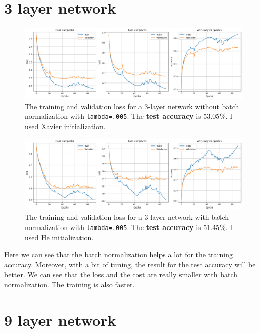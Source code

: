 \documentclass{article}
\begin{document}
\section*{3 layer network}

\begin{figure}[H]
    \centering
    \includegraphics[width=\linewidth]{Result_Pics/3 layer - no BN.png}
    \caption{The training and validation loss for a 3-layer network without batch normalization with \texttt{lambda=.005}. The \textbf{test accuracy} is 53.05\%. I used Xavier initialization.}
\end{figure}

\begin{figure}[H]
    \centering
    \includegraphics[width=\linewidth]{Result_Pics/3 layer - BN.png}
    \caption{The training and validation loss for a 3-layer network with batch normalization with \texttt{lambda=.005}. The \textbf{test accuracy} is 51.45\%. I used He initialization.}
\end{figure}

Here we can see that the batch normalization helps a lot for the training accuracy. Moreover, with a bit of tuning, the result for the test accuracy will be better. We can see that the loss and the cost are really smaller with batch normalization. The training is also faster. \\

\section*{9 layer network}
\end{document}
